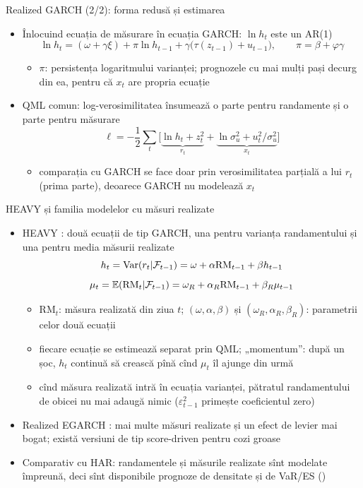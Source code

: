 \begin{frame}{Realized GARCH (2/2): forma redusă și estimarea}
\itemsize{\small}
\begin{itemize}
    \item Înlocuind ecuația de măsurare în ecuația GARCH: $\ln h_t$ este un AR(1)
    \[ \ln h_t = (\omega + \gamma\xi) + \pi\ln h_{t-1} + \gamma\big(\tau(z_{t-1}) + u_{t-1}\big), \qquad \pi = \beta + \varphi\gamma \]
    \begin{itemize}
        \item $\pi$: persistența logaritmului varianței; prognozele cu mai mulți pași decurg din ea, pentru că $x_t$ are propria ecuație
    \end{itemize}
    \item QML comun: log-verosimilitatea însumează o parte pentru randamente și o parte pentru măsurare
    \[ \ell = -\frac12\sum_t\Big[\underbrace{\ln h_t + z_t^2}_{r_t} + \underbrace{\ln\sigma^2_u + u_t^2/\sigma^2_u}_{x_t}\Big] \]
    \begin{itemize}
        \item comparația cu GARCH se face doar prin verosimilitatea parțială a lui $r_t$ (prima parte), deoarece GARCH nu modelează $x_t$
    \end{itemize}
\end{itemize}
\end{frame}

\begin{frame}{HEAVY și familia modelelor cu măsuri realizate}
\itemsize{\footnotesize}
\begin{itemize}
    \item HEAVY : două ecuații de tip GARCH, una pentru varianța randamentului și una pentru media măsurii realizate
    \[ h_t = \text{Var}(r_t | \mathcal F_{t-1}) = \omega + \alpha\mathrm{RM}_{t-1} + \beta h_{t-1} \]
    \[ \mu_t = \mathbb{E}(\mathrm{RM}_t | \mathcal F_{t-1}) = \omega_R + \alpha_R\mathrm{RM}_{t-1} + \beta_R\mu_{t-1} \]
    \begin{itemize}
        \item $\mathrm{RM}_t$: măsura realizată din ziua $t$; $(\omega, \alpha, \beta)$ și $(\omega_R, \alpha_R, \beta_R)$: parametrii celor două ecuații
        \item fiecare ecuație se estimează separat prin QML; „momentum”: după un șoc, $h_t$ continuă să crească pînă cînd $\mu_t$ îl ajunge din urmă
        \item cînd măsura realizată intră în ecuația varianței, pătratul randamentului de obicei nu mai adaugă nimic ($\varepsilon^2_{t-1}$ primește coeficientul zero)
    \end{itemize}
    \item Realized EGARCH : mai multe măsuri realizate și un efect de levier mai bogat; există versiuni de tip score-driven pentru cozi groase
    \item Comparativ cu HAR: randamentele și măsurile realizate sînt modelate împreună, deci sînt disponibile prognoze de densitate și de VaR/ES ()
\end{itemize}
\end{frame}

